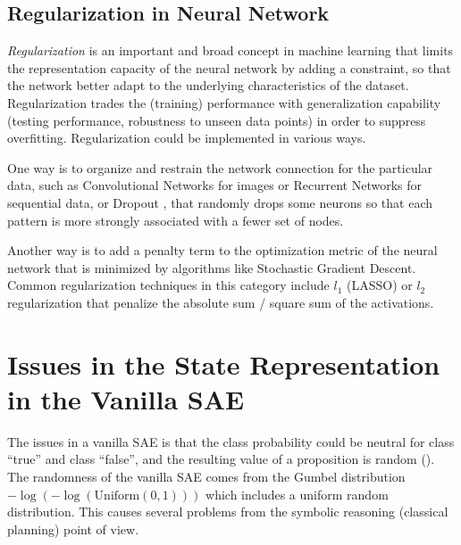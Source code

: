 \subsection{Regularization in Neural Network}

\emph{Regularization} is an important and broad concept in machine learning
that limits the representation capacity of the neural network by adding a constraint,
so that the network better adapt to the underlying characteristics of the dataset.
Regularization trades the (training) performance with generalization capability (testing performance, robustness to
unseen data points) in order to suppress overfitting.
Regularization could be implemented in various ways.

One way is to organize and restrain the network connection for the particular data,
such as Convolutional Networks for images
or Recurrent Networks for sequential data, or
Dropout \cite{srivastava2014dropout}, that randomly drops some neurons so
that each pattern is more strongly associated with a fewer set of nodes.

Another way is to add a penalty term to the optimization metric of the
neural network that is minimized by algorithms like Stochastic
Gradient Descent.
Common regularization techniques in this category include
$l_1$ (LASSO) or $l_2$ regularization that penalize the absolute sum / square sum of the
activations.



\section{Issues in the State Representation\\ in the Vanilla SAE}
\label{issues}

The issues in a vanilla SAE is that the class probability could be
neutral for class ``true'' and class ``false'', and the resulting value
of a proposition is random ().
The randomness of the vanilla SAE comes from
the Gumbel distribution $-\log (-\log (\text{Uniform}(0,1)))$ which includes
a uniform random distribution.
This causes several problems from the symbolic reasoning (classical planning) point of view.

